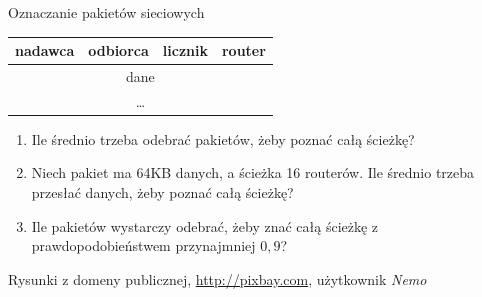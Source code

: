 \documentclass{mp}
\begin{document}
\begin{frame}{Oznaczanie pakietów sieciowych}
\begin{center}
\begin{tikzpicture}
\end{tikzpicture}
\end{center}
{
\begin{center}
\begin{tabular}{|p{2cm}|p{2cm}|p{1cm}|p{2cm}|}
\hline
nadawca & odbiorca & licznik & \textcolor{color2}{router} \\
\hline
\multicolumn{4}{|c|}{dane} \\
\multicolumn{4}{|c|}{\ldots} \\
\hline
\end{tabular}
\end{center}
}
{
	\begin{enumerate}
		\item<3-> Ile średnio trzeba odebrać pakietów, żeby poznać całą ścieżkę?
		\item<4-> Niech pakiet ma 64KB danych, a ścieżka 16 routerów. Ile średnio trzeba przesłać danych, żeby poznać całą ścieżkę?
		\item<4-> Ile pakietów wystarczy odebrać, żeby znać całą ścieżkę z prawdopodobieństwem przynajmniej $0{,}9$?
	\end{enumerate}
}
\vfill
\tiny{Rysunki z domeny publicznej, \url{http://pixbay.com}, użytkownik \emph{Nemo}}
\end{frame}

\end{document}
